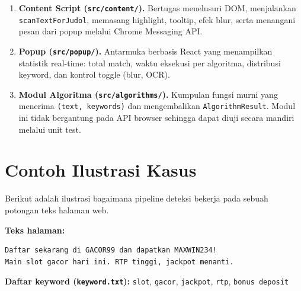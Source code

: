 \begin{enumerate}
    \item \textbf{Content Script (\texttt{src/content/}).}
    Bertugas menelusuri DOM, menjalankan \texttt{scanTextForJudol},
    memasang highlight, tooltip, efek blur, serta menangani pesan dari
    popup melalui Chrome Messaging API.

    \item \textbf{Popup (\texttt{src/popup/}).}
    Antarmuka berbasis React yang menampilkan statistik real-time:
    total match, waktu eksekusi per algoritma, distribusi keyword, dan
    kontrol toggle (blur, OCR).

    \item \textbf{Modul Algoritma (\texttt{src/algorithms/}).}
    Kumpulan fungsi murni yang menerima \texttt{(text, keywords)} dan
    mengembalikan \texttt{AlgorithmResult}. Modul ini tidak bergantung
    pada API browser sehingga dapat diuji secara mandiri melalui unit
    test.
\end{enumerate}

\section{Contoh Ilustrasi Kasus}

Berikut adalah ilustrasi bagaimana pipeline deteksi bekerja pada sebuah
potongan teks halaman web.

\textbf{Teks halaman:}
\begin{verbatim}
Daftar sekarang di GACOR99 dan dapatkan MAXWIN234!
Main slot gacor hari ini. RTP tinggi, jackpot menanti.
\end{verbatim}

\textbf{Daftar keyword (\texttt{keyword.txt}):} \texttt{slot}, \texttt{gacor},
\texttt{jackpot}, \texttt{rtp}, \texttt{bonus deposit}

